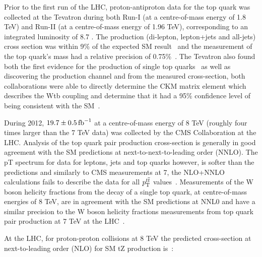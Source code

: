 
Prior to the first run of the LHC, proton-antiproton data for the top quark was collected at the Tevatron during both Run-I (at a centre-of-mass energy of 1.8 TeV) and Run-II (at a centre-of-mass energy of 1.96 TeV), corresponding to an integrated luminosity of 8.7 \fbinv.
The \ttbar production (di-lepton, lepton+jets and all-jets) cross section was within 9\% of the expected SM result~\cite{Lister:2008it} and the measurement of the top quark’s mass had a relative precision of 0.75\%~\cite{Group:2009ad}.
The Tevatron also found both the first evidence for the production of single top quarks~\cite{Abazov:2006gd} as well as discovering the production channel and from the measured cross-section, both collaborations were able to directly determine the CKM matrix element which describes the Wtb coupling and determine that it had a 95\% confidence level of being consistent with the SM~\cite{Aaltonen:2009jj}.

During 2012, $19.7\pm0.5 \mbox{\ensuremath{\,\text{fb}^\text{$-$1}}}$ at a centre-of-mass energy of 8 TeV (roughly four times larger than the 7 TeV data) was collected by the CMS Collaboration at the LHC. 
Analysis of the top quark pair production cross-section is generally in good agreement with the SM predictions at next-to-next-to-leading order (NNLO). 
The pT spectrum for data for leptons, jets and top quarks however, is softer than the predictions and similarly to CMS measurements at 7\TeV, the NLO+NNLO calculations fails to describe the data for all $p_{\mathrm{T}}^{t\overline{t}}$ values~\cite{Khachatryan:2015oqa}. 
Measurements of the W boson helicity fractions from the decay of a single top quark, at centre-of-mass energies of 8 TeV, are in agreement with the SM predictions at NNL0  and have a similar precision to the W boson helicity fractions measurements from top quark pair production at 7 TeV at the LHC~\cite{Khachatryan:2014vma}.

At the LHC, for proton-proton collisions at 8 TeV the predicted cross-section at next-to-leading order (NLO) for SM tZ production is~\cite{Campbell:2013yla}:

